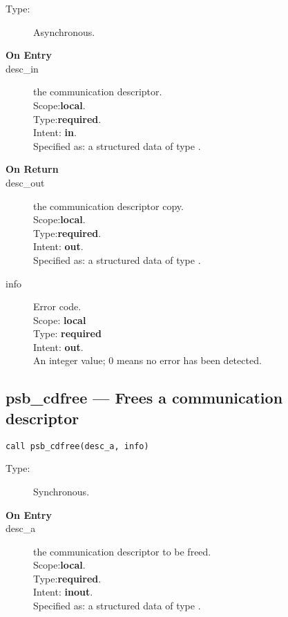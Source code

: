 \begin{description}
\item[Type:] Asynchronous.
\item[\bf On Entry]
\item[desc\_in] the communication descriptor.\\
Scope:{\bf local}.\\
Type:{\bf required}.\\
Intent: {\bf in}.\\
Specified as: a structured data of type \descdata.

\end{description}

\begin{description}
\item[\bf On Return]
\item[desc\_out] the communication descriptor copy.\\
Scope:{\bf local}.\\
Type:{\bf required}.\\
Intent: {\bf out}.\\
Specified as: a structured data of type \descdata.
\item[info] Error code.\\
Scope: {\bf local} \\
Type: {\bf required} \\
Intent: {\bf out}.\\
An integer value; 0 means no error has been detected. 
\end{description}


%
%
\clearpage\subsection*{psb\_cdfree --- Frees a communication descriptor}

\begin{verbatim}
call psb_cdfree(desc_a, info)
\end{verbatim}

\begin{description}
\item[Type:] Synchronous.
\item[\bf On Entry]
\item[desc\_a] the communication descriptor to be freed.\\
Scope:{\bf local}.\\
Type:{\bf required}.\\
Intent: {\bf inout}.\\
Specified as: a structured data of type \descdata.
\end{description}

